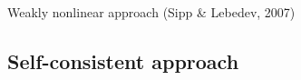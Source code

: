 \documentclass{beamer}
\begin{document}
\begin{frame}{Weakly nonlinear approach {\small (Sipp \& Lebedev, 2007)}}








\end{frame}

\subsection{Self-consistent approach}
\end{document}
